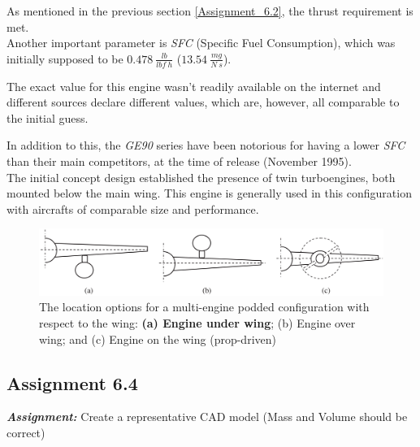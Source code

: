 \documentclass{article}
\begin{document}
As mentioned in the previous section \ref{Assignment_6.2}, the thrust requirement is met.\\

Another important parameter is \textit{SFC} (Specific Fuel Consumption), which was initially supposed to be 
$0.478 \ \frac{lb}{lbf \ h}$  ($13.54 \ \frac{mg}{N \ s}$). 

The exact value for this engine wasn't readily available on the internet and different sources
declare different values, which are, however, all comparable to the initial guess.

In addition to this, the \textit{GE90} series have been notorious for having a lower \textit{SFC} 
than their main competitors, at the time of release (November 1995).\\ 

The initial concept design established the presence of twin turboengines, both mounted below the main wing.
This engine is generally used in this configuration with aircrafts of comparable size and performance. \\ 

\begin{figure}[h!]
    \centering
    \includegraphics[width=\textwidth]{Sources/Plots_and_Pictures/engine_location.png}
    \caption{The location options for a multi-engine podded configuration with respect to the
    wing: \textbf{(a) Engine under wing}; (b) Engine over wing; and (c) Engine on the wing (prop-driven) \autocite{Sadraey_Mohammad}}
    \label{engine_location}
\end{figure}


\clearpage




\subsection{Assignment 6.4\label{Assignment_6.4}}

\textbf{\textit{Assignment:}} Create a representative CAD model 
(Mass and Volume should be correct) \\ \\ \\ 
\end{document}
